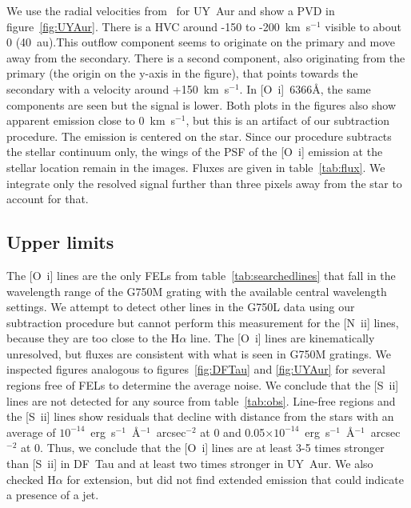 \documentclass[twocolumn,trackchanges]{aastex63}
\begin{document}
We use the radial velocities from~\citet{2012ApJ...745..119N} for UY~Aur and
show a PVD in figure~\ref{fig:UYAur}.  
There is a HVC around -150 to
-200~km~s$^{-1}$ visible to about 0 (40~au).This outflow component
seems to originate on the primary and move away from the secondary. There is a
second component, also originating from the primary (the origin on the y-axis
in the figure), that points towards the secondary with a velocity around
+150~km~s$^{-1}$. In [O~{\sc i}]~6366\AA{}, the same components are seen but
the signal is lower. Both plots in the figures also show apparent emission
close to 0~km~s$^{-1}$, but this is an artifact of our subtraction
procedure. The emission is centered on the star. Since our procedure subtracts
the stellar continuum only, the wings of the PSF of the [O~{\sc i}] emission at
the stellar location remain in the images. Fluxes are given in
table~\ref{tab:flux}. 
We
integrate only the resolved signal further than three pixels away from the star
to account for that.


\subsection{Upper limits}
The [O~{\sc i}] lines are the only FELs from table~\ref{tab:searchedlines} that fall in the wavelength range of the G750M grating with the available central wavelength settings. We attempt to detect other lines in the G750L data using our subtraction procedure but cannot perform this measurement for the [N~{\sc ii}] lines, because they are too close to the H$\alpha$ line. The [O~{\sc i}] lines are kinematically unresolved, but fluxes are consistent with what is seen in G750M gratings. We inspected figures analogous to figures~\ref{fig:DFTau} and \ref{fig:UYAur} for several regions free of FELs to determine the average noise. We conclude that the [S~{\sc ii}] lines are not detected for any source from table~\ref{tab:obs}. Line-free regions and the [S~{\sc ii}] lines show residuals that decline with distance from the stars with an average of $10^{-14}$~erg~s$^{-1}$~\AA{}$^{-1}$~arcsec$^{-2}$ at 0 and 0.05$\times10^{-14}$~erg~s$^{-1}$~\AA{}$^{-1}$~arcsec$^{-2}$ at 0. Thus, we conclude that the [O~{\sc i}] lines are at least 3-5 times stronger than [S~{\sc ii}] in DF~Tau and at least two times stronger in UY~Aur. We also checked H$\alpha$ for extension, but did not find extended emission that could indicate a presence of a jet. 
\end{document}
